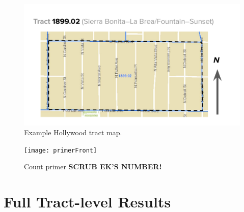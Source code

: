 \documentclass[11pt,twocolumn]{article}
\def\bfr{\bf\color{red}}
\begin{document}
\begin{figure}
	\centering
	\includegraphics[width =\linewidth]{tractMap}
	\caption{Example Hollywood tract map.}
\end{figure}

\begin{figure}
	\centering
	\texttt{[image: primerFront]}
	\caption{Count primer {\bfr SCRUB EK'S NUMBER!}}
\end{figure}

\section{Full Tract-level Results}
\end{document}
